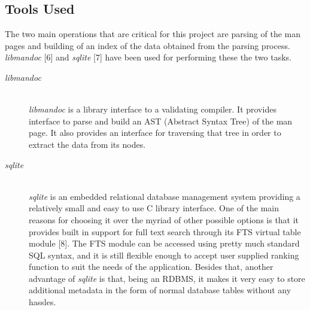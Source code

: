 \documentclass[titlepage, a4paper, 12pt]{article}
\begin{document}
\subsection{Tools Used}
The two main operations that are critical for this project are parsing of the
man pages and building of an index of the
data obtained from the parsing process. \textit{libmandoc} [6]
and \textit{sqlite} [7] have been used for performing these the two tasks.
\begin{description}
\item[\textit{libmandoc}] \hfill \\
\textit{libmandoc} is a library interface to a validating compiler. It provides
interface to parse and build an AST (Abstract Syntax Tree) of the man page. It
also provides an interface for traversing that tree in order to extract the data
from its nodes.
\end{description}
\begin{description}
\item[\textit{sqlite}] \hfill \\
\textit{sqlite} is an embedded relational database management system providing a
relatively small and easy to use C library interface. One of the main reasons
for choosing it over the myriad of other possible options is that it provides
built in support for full text search through its FTS virtual table module [8].
The FTS module can be accessed using pretty much standard SQL syntax, and it is
still flexible enough to accept user supplied ranking function to suit the needs
of the application. Besides that, another advantage of \textit{sqlite} is that, 
being an RDBMS, it makes it very easy to store additional metadata in the form
of normal database tables without any hassles.
\end{description}
\end{document}
